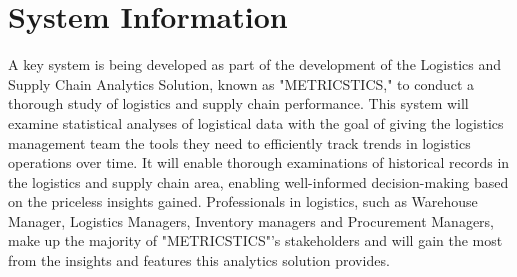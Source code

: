 \documentclass[english,12pt,a4paper]{report}
\begin{document}
	\section{System Information}
	A key system is being developed as part of the development of the Logistics and Supply Chain 	Analytics Solution, known as "METRICSTICS," to conduct a thorough study of logistics and supply chain performance. This system will examine statistical analyses of logistical data with the goal of giving the logistics management team the tools they need to efficiently track trends in logistics operations over time. It will enable thorough examinations of historical records in the logistics and supply chain area, enabling well-informed decision-making based on the priceless insights gained. Professionals in logistics, such as Warehouse Manager, Logistics Managers, Inventory managers and Procurement Managers, make up the majority of "METRICSTICS"'s stakeholders and will gain the most from the insights and features this analytics solution provides.
	
\end{document}
